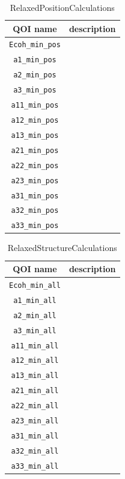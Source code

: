 \begin{table}[ht]
	\centering
	\caption{RelaxedPositionCalculations}
	\begin{tabular}{cc}
		\hline
		QOI name & description \\
		\hline
		\verb|Ecoh_min_pos| \\
	  \verb|a1_min_pos| \\
		\verb|a2_min_pos| \\
		\verb|a3_min_pos| \\
	  \verb|a11_min_pos| \\
		\verb|a12_min_pos| \\
		\verb|a13_min_pos| \\
	  \verb|a21_min_pos| \\
		\verb|a22_min_pos| \\
		\verb|a23_min_pos| \\
	  \verb|a31_min_pos| \\
		\verb|a32_min_pos| \\
		\verb|a33_min_pos| \\
		\hline
	\end{tabular}
\end{table}

\begin{table}[ht]
	\centering
	\caption{RelaxedStructureCalculations}
	\begin{tabular}{cc}
		\hline
		QOI name & description \\
		\hline
	  \verb|Ecoh_min_all| \\
    \verb|a1_min_all| \\
		\verb|a2_min_all| \\
		\verb|a3_min_all| \\
		\verb|a11_min_all| \\
		\verb|a12_min_all| \\
		\verb|a13_min_all| \\
		\verb|a21_min_all| \\
		\verb|a22_min_all| \\
		\verb|a23_min_all| \\
		\verb|a31_min_all| \\
		\verb|a32_min_all| \\
		\verb|a33_min_all| \\
		\hline
	\end{tabular}
\end{table}

